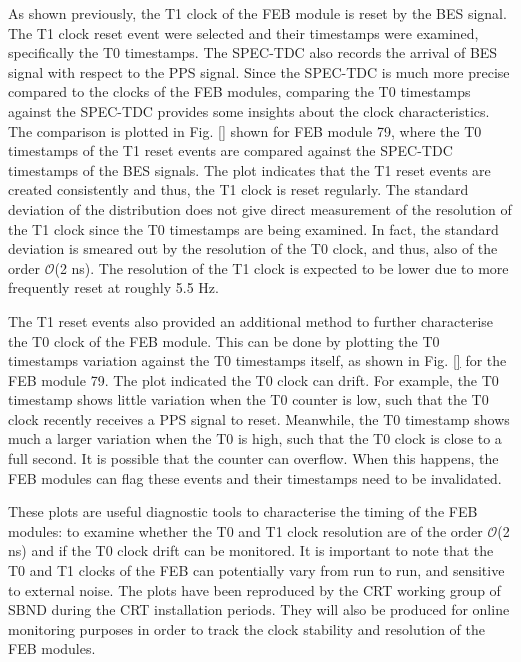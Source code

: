 As shown previously, the T1 clock of the FEB module is reset by the BES signal.
The T1 clock reset event were selected and their timestamps were examined, specifically the T0 timestamps.
The SPEC-TDC also records the arrival of BES signal with respect to the PPS signal.
Since the SPEC-TDC is much more precise compared to the clocks of the FEB modules, comparing the T0 timestamps against the SPEC-TDC provides some insights about the clock characteristics.
The comparison is plotted in Fig. \ref{} shown for FEB module 79, where the T0 timestamps of the T1 reset events are compared against the SPEC-TDC timestamps of the BES signals.
The plot indicates that the T1 reset events are created consistently and thus, the T1 clock is reset regularly.
The standard deviation of the distribution does not give direct measurement of the resolution of the T1 clock since the T0 timestamps are being examined. 
In fact, the standard deviation is smeared out by the resolution of the T0 clock, and thus, also of the order $\mathcal{O}$(2 ns).
The resolution of the T1 clock is expected to be lower due to more frequently reset at roughly 5.5 Hz.

The T1 reset events also provided an additional method to further characterise the T0 clock of the FEB module. 
This can be done by plotting the T0 timestamps variation against the T0 timestamps itself, as shown in Fig. \ref{} for the FEB module 79.
The plot indicated the T0 clock can drift.
For example, the T0 timestamp shows little variation when the T0 counter is low, such that the T0 clock recently receives a PPS signal to reset.
Meanwhile, the T0 timestamp shows much a larger variation when the T0 is high, such that the T0 clock is close to a full second.
It is possible that the counter can overflow.
When this happens, the FEB modules can flag these events and their timestamps need to be invalidated.

These plots are useful diagnostic tools to characterise the timing of the FEB modules: to examine whether the T0 and T1 clock resolution are of the order $\mathcal{O}$(2 ns) and if the T0 clock drift can be monitored.
It is important to note that the T0 and T1 clocks of the FEB can potentially vary from run to run, and sensitive to external noise. 
The plots have been reproduced by the CRT working group of SBND during the CRT installation periods.
They will also be produced for online monitoring purposes in order to track the clock stability and resolution of the FEB modules.

